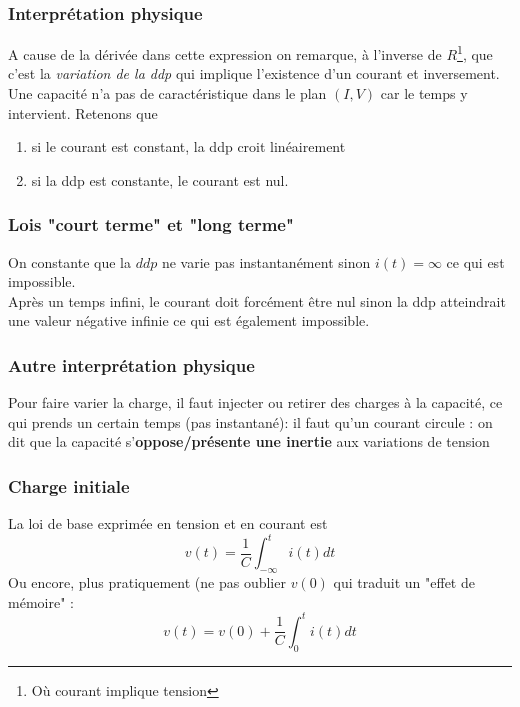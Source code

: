 \documentclass	[11pt, a4paper, openany]{book}
\begin{document}
\subsubsection{Interprétation physique}
A cause de la dérivée dans cette expression on remarque, à l'inverse de $R$\footnote{Où courant implique tension}, que c'est la \textit{variation de la ddp} qui implique l'existence d'un courant et inversement.\\
Une capacité n'a pas de caractéristique dans le plan $(I,V)$ car le temps y intervient. Retenons que
\begin{enumerate}
\item si le courant est constant, la ddp croit linéairement
\item si la ddp est constante, le courant est nul.
\end{enumerate}

\subsubsection{Lois "court terme" et "long terme"}
On constante que la $ddp$ ne varie pas instantanément sinon $i(t) = \infty$ ce qui est impossible.\\
Après un temps infini, le courant doit forcément être nul sinon la ddp atteindrait une valeur négative infinie ce qui est également impossible.

\subsubsection{Autre interprétation physique}
Pour faire varier la charge, il faut injecter ou retirer des charges à la capacité, ce qui prends un certain temps (pas instantané): il faut qu'un courant circule : on dit que la capacité s'\textbf{oppose/présente une inertie} aux variations de tension

\subsubsection{Charge initiale}
La loi de base exprimée en tension et en courant est 
\begin{equation}
v(t) = \frac{1}{C} \int_{-\infty}^t i(t) dt
\end{equation}
Ou encore, plus pratiquement (ne pas oublier $v(0)$ qui traduit un "effet de mémoire" :
\begin{equation}
v(t) = v(0) + \frac{1}{C} \int_0^t i(t) dt
\end{equation}
\end{document}
